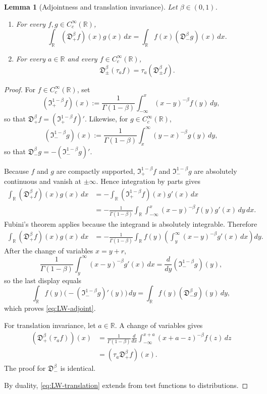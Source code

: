 \documentclass[11pt,a4paper]{amsart}
\theoremstyle{plain}
\newtheorem{lemma}[theorem]{Lemma}
\theoremstyle{definition}
\theoremstyle{remark}
\newcommand{\R}{\mathbb{R}}
\begin{document}
\begin{lemma}[Adjointness and translation invariance]\label{lem:LW-basic}
Let $\beta\in(0,1)$.
\begin{enumerate}[label=(\roman*)]
\item For every $f,g\in C_c^\infty(\R)$,
\begin{equation}\label{eq:LW-adjoint}
\int_\R (\mathfrak D_+^\beta f)(x)g(x)\,dx
=
\int_\R f(x)(\mathfrak D_-^\beta g)(x)\,dx.
\end{equation}
\item For every $a\in\R$ and every $f\in C_c^\infty(\R)$,
\begin{equation}\label{eq:LW-translation}
\mathfrak D_\pm^\beta(\tau_a f)
=
\tau_a(\mathfrak D_\pm^\beta f).
\end{equation}
\end{enumerate}
\end{lemma}

\begin{proof}
For $f\in C_c^\infty(\R)$, set
\[
(\mathfrak I_+^{1-\beta}f)(x)
:=
\frac{1}{\Gamma(1-\beta)}
\int_{-\infty}^x (x-y)^{-\beta}f(y)\,dy,
\]
so that $\mathfrak D_+^\beta f=(\mathfrak I_+^{1-\beta}f)'$. Likewise, for
$g\in C_c^\infty(\R)$,
\[
(\mathfrak I_-^{1-\beta}g)(x)
:=
\frac{1}{\Gamma(1-\beta)}
\int_x^\infty (y-x)^{-\beta}g(y)\,dy,
\]
so that $\mathfrak D_-^\beta g=-(\mathfrak I_-^{1-\beta}g)'$.

Because $f$ and $g$ are compactly supported, $\mathfrak I_+^{1-\beta}f$ and
$\mathfrak I_-^{1-\beta}g$ are absolutely continuous and vanish at $\pm\infty$. Hence
integration by parts gives
\begin{align*}
\int_\R (\mathfrak D_+^\beta f)(x)g(x)\,dx
&=
-\int_\R (\mathfrak I_+^{1-\beta}f)(x)g'(x)\,dx \\
&=
-\frac{1}{\Gamma(1-\beta)}
\int_\R\int_{-\infty}^x (x-y)^{-\beta}f(y)g'(x)\,dy\,dx.
\end{align*}
Fubini's theorem applies because the integrand is absolutely integrable. Therefore
\begin{align*}
\int_\R (\mathfrak D_+^\beta f)(x)g(x)\,dx
&=
-\frac{1}{\Gamma(1-\beta)}
\int_\R f(y)\left(\int_y^\infty (x-y)^{-\beta}g'(x)\,dx\right)dy.
\end{align*}
After the change of variables $x=y+r$,
\[
\frac{1}{\Gamma(1-\beta)}\int_y^\infty (x-y)^{-\beta}g'(x)\,dx
=
\frac{d}{dy}(\mathfrak I_-^{1-\beta}g)(y),
\]
so the last display equals
\[
\int_\R f(y)\bigl(-(\mathfrak I_-^{1-\beta}g)'(y)\bigr)\,dy
=
\int_\R f(y)(\mathfrak D_-^\beta g)(y)\,dy,
\]
which proves \eqref{eq:LW-adjoint}.

For translation invariance, let $a\in\R$. A change of variables gives
\begin{align*}
(\mathfrak D_+^\beta(\tau_a f))(x)
&=
\frac{1}{\Gamma(1-\beta)}
\frac{d}{dx}
\int_{-\infty}^{x+a} (x+a-z)^{-\beta}f(z)\,dz \\
&=
(\tau_a \mathfrak D_+^\beta f)(x).
\end{align*}
The proof for $\mathfrak D_-^\beta$ is identical.
\par
By duality, \eqref{eq:LW-translation} extends from test functions to distributions.
\end{proof}
\end{document}
